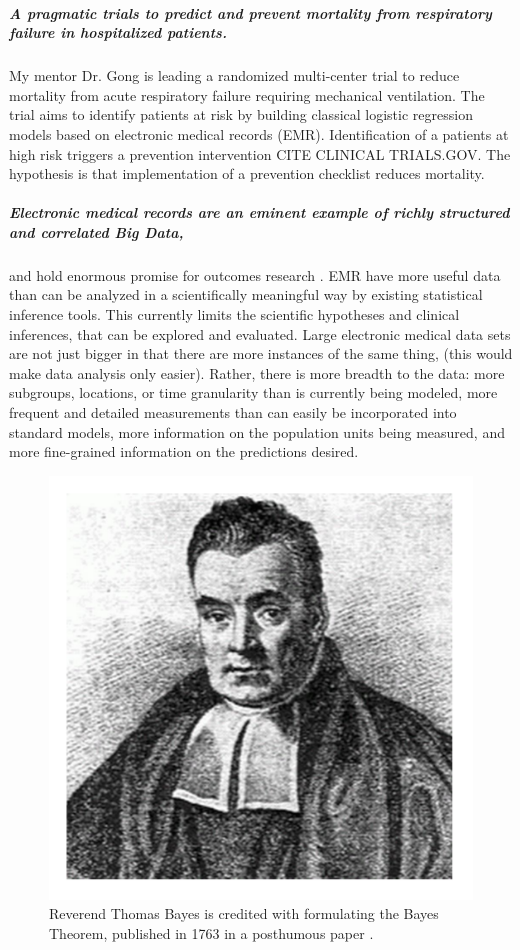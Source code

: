 \documentclass[11pt,notitlepage]{article}
\begin{document}
\subparagraph{A pragmatic trials to predict and prevent mortality from respiratory failure in hospitalized patients.} My mentor Dr. Gong is leading a randomized multi-center trial to reduce mortality from acute respiratory failure requiring mechanical ventilation. The trial aims to identify patients at risk by building classical logistic regression models based on electronic medical records (EMR). Identification of a patients at high risk triggers a prevention intervention CITE CLINICAL TRIALS.GOV. The hypothesis is that implementation of a prevention checklist reduces mortality. 

\subparagraph{Electronic medical records are an eminent example of richly structured and correlated Big Data,} 
and hold enormous promise for outcomes research \cite{Dean_19279318}. EMR have more useful data than can be analyzed in a scientifically meaningful way by existing statistical inference tools. This currently limits the scientific hypotheses and clinical inferences, that can be explored and evaluated. Large electronic medical data sets are not just bigger in that there are more instances of the same thing, (this would make data analysis only easier). Rather, there is more breadth to the data: more subgroups, locations, or time granularity than is currently being modeled, more frequent and detailed measurements than can easily be incorporated into standard models, more information on the population units being measured, and more fine-grained information on the predictions desired. 


\begin{figure} %
\includegraphics[scale=0.15]{Figures/Thomas_Bayes.pdf}
\caption{\footnotesize Reverend Thomas Bayes is credited with formulating the Bayes Theorem, published in 1763 in a posthumous paper  \cite{Thomas_Bayes}.}
\end{figure}
\end{document}
